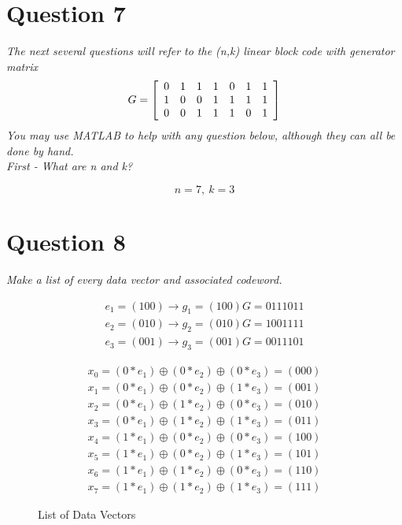 \documentclass[12pt]{report}
\begin{document}
\newpage

\section*{Question 7}
\textit{The next several questions will refer to the (n,k) linear block code with generator matrix \\
    \begin{gather*}
        G =
        \left[ \begin{array}{ c c c c c c c }
                0 & 1 & 1 & 1 & 0 & 1 & 1 \\
                1 & 0 & 0 & 1 & 1 & 1 & 1 \\
                0 & 0 & 1 & 1 & 1 & 0 & 1 \\
        \end{array} \right]
    \end{gather*}
You may use MATLAB to help with any question below, although they can all be done by
hand. \\
First - What are n and k?}

\begin{equation}
    n = 7,\ k = 3
\end{equation}

\section*{Question 8}
\textit{Make a list of every data vector and associated codeword.}

\begin{gather*}
    e_1 = (100) \rightarrow g_1 = (100)G = 0111011 \\
    e_2 = (010) \rightarrow g_2 = (010)G = 1001111 \\
    e_3 = (001) \rightarrow g_3 = (001)G = 0011101
\end{gather*}

\newcommand{\genDV}[3]{(#1*e_1) \oplus (#2*e_2) \oplus (#3*e_3) = (#1#2#3)}

\begin{figure}[H]
    \begin{gather*}
        x_0 = \genDV{0}{0}{0} \\
        x_1 = \genDV{0}{0}{1} \\
        x_2 = \genDV{0}{1}{0} \\ 
        x_3 = \genDV{0}{1}{1} \\
        x_4 = \genDV{1}{0}{0} \\
        x_5 = \genDV{1}{0}{1} \\
        x_6 = \genDV{1}{1}{0} \\
        x_7 = \genDV{1}{1}{1}
    \end{gather*}
    \caption{List of Data Vectors}
\end{figure}
\end{document}
